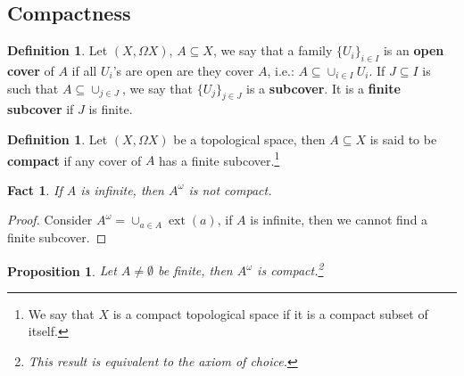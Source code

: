 \documentclass{tufte-handout} %
\newtheorem{prop}[thm]{Proposition}
\newtheorem{fact}[thm]{Fact}
\theoremstyle{definition}
\newtheorem{defn}[thm]{Definition}
\theoremstyle{remark}
\newcommand{\0}{\textsf{0}}
\newcommand{\1}{\textsf{1}}
\DeclareMathOperator{\ext}{ext}
\begin{document}
\subsection{Compactness}
\begin{defn}
	Let $(X, \Omega X)$, $A \subseteq X$, we say that a family $\{U_i\}_{i \in I}$ is an \textbf{open cover} of $A$ if all $U_i$'s are open are they cover $A$, i.e.: $A \subseteq \cup_{i \in I} U_i$. If $J \subseteq I$ is such that $A \subseteq \cup_{j \in J}$, we say that $\{U_j\}_{j\in J}$ is a \textbf{subcover}. It is a \textbf{finite subcover} if $J$ is finite.
\end{defn}
\begin{defn}
	Let $(X, \Omega X)$ be a topological space, then $A \subseteq X$ is said to be \textbf{compact} if any cover of $A$ has a finite subcover.\footnote{We say that $X$ is a compact topological space if it is a compact subset of itself.}
\end{defn}
\begin{fact}
	If $A$ is infinite, then $A^{\omega}$ is not compact.
\end{fact}
\begin{proof}
	Consider $A^\omega = \cup_{a \in A} \ext(a)$, if $A$ is infinite, then we cannot find a finite subcover.
\end{proof}
\begin{prop}
	Let $A\neq \emptyset$ be finite, then $A^{\omega}$ is compact.\footnote{This result is equivalent to the axiom of choice.}
\end{prop}
\end{document}
